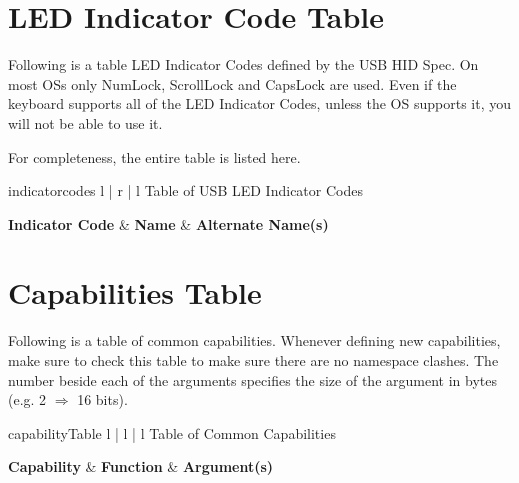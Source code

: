 \documentclass{kiibohd-template}
\begin{document}
\chapter{LED Indicator Code Table}
\label{chpt:LEDIndicatorCodeTable}
Following is a table LED Indicator Codes defined by the USB HID Spec.
On most OSs only NumLock, ScrollLock and CapsLock are used.
Even if the keyboard supports all of the LED Indicator Codes, unless the OS supports it, you will not be able to use it.

For completeness, the entire table is listed here.

\begin{ltable}{indicatorcodes}{ l | r | l }{Table of USB LED Indicator Codes}

\textbf{Indicator Code} & \textbf{Name} & \textbf{Alternate Name(s)} \\
\hline
\hline


\end{ltable}


\newpage
\chapter{Capabilities Table}
\label{chpt:CapabilitiesTable}

Following is a table of common capabilities.
Whenever defining new capabilities, make sure to check this table to make sure there are no namespace clashes.
The number beside each of the arguments specifies the size of the argument in bytes (e.g. 2 $\Rightarrow$ 16 bits).

\begin{ltable}{capabilityTable}{ l | l | l }{Table of Common Capabilities}

\textbf{Capability} & \textbf{Function} & \textbf{Argument(s)} \\
\hline
\hline


\end{ltable}
\end{document}
